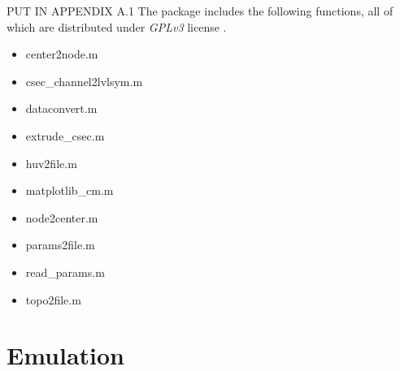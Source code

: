 PUT IN APPENDIX A.1 
The package includes the following functions, all of which are distributed under \textit {GPLv3} license \autocite{smith_quick_2014}.
 
\begin{itemize}
\itemsep0em
  \item center2node.m
  \item csec\_channel2lvlsym.m
  \item dataconvert.m
  \item extrude\_csec.m
  \item huv2file.m
  \item matplotlib\_cm.m
  \item node2center.m
  \item params2file.m
  \item read\_params.m
  \item topo2file.m
\end{itemize}

\section{Emulation}





